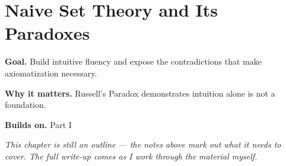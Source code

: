 \chapter{Naive Set Theory and Its Paradoxes}
\label{ch:02-set-theory-01}

\begin{chapterintro}
\textbf{Goal.} Build intuitive fluency and expose the contradictions that make axiomatization necessary.

\textbf{Why it matters.} Russell's Paradox demonstrates intuition alone is not a foundation.

\textbf{Builds on.} Part I
\end{chapterintro}

\textit{This chapter is still an outline --- the notes above mark out what it needs to cover. The full write-up comes as I work through the material myself.}

